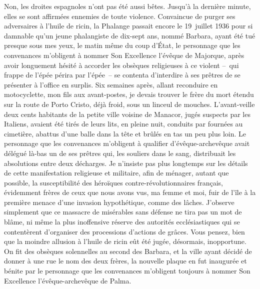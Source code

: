 \documentclass[french,twoside]{book} %
\newcommand{\astertri}{\medskip\par\centerline{\color{rubric}\large\selectfont{\syms ✻\,✻\,✻}}\medskip\par}%
\begin{document}
Non, les droites espagnoles n’ont pas été aussi bêtes. Jusqu’à la dernière minute, elles se sont affirmées ennemies de toute violence. Convaincue de purger ses adversaires à l’huile de ricin, la Phalange passait encore le 19 juillet 1936 pour si damnable qu’un jeune phalangiste de dix-sept ans, nommé Barbara, ayant été tué presque sous mes yeux, le matin même du coup d’État, le personnage que les convenances m’obligent à nommer Son Excellence l’évêque de Majorque, après avoir longuement hésité à accorder les obsèques religieuses à ce violent – qui frappe de l’épée périra par l’épée – se contenta d’interdire à ses prêtres de se présenter à l’office en surplis. Six semaines après, allant reconduire en motocyclette, mon fils aux avant-postes, je devais trouver le frère du mort étendu sur la route de Porto Cristo, déjà froid, sous un linceul de mouches. L’avant-veille deux cents habitants de la petite ville voisine de Manacor, jugés suspects par les Italiens, avaient été tirés de leurs lits, en pleine nuit, conduits par fournées au cimetière, abattus d’une balle dans la tête et brûlés en tas un peu plus loin. Le personnage que les convenances m’obligent à qualifier d’évêque-archevêque avait délégué là-bas un de ses prêtres qui, les souliers dans le sang, distribuait les absolutions entre deux décharges. Je n’insiste pas plus longtemps sur les détails de cette manifestation religieuse et militaire, afin de ménager, autant que possible, la susceptibilité des héroïques contre-révolutionnaires français, évidemment frères de ceux que nous avons vus, ma femme et moi, fuir de l’île à la première menace d’une invasion hypothétique, comme des lâches. J’observe simplement que ce massacre de misérables sans défense ne tira pas un mot de blâme, ni même la plus inoffensive réserve des autorités ecclésiastiques qui se contentèrent d’organiser des processions d’actions de grâces. Vous pensez, bien que la moindre allusion à l’huile de ricin eût été jugée, désormais, inopportune. On fit des obsèques solennelles au second des Barbara, et la ville ayant décidé de donner à une rue le nom des deux frères, la nouvelle plaque en fut inaugurée et bénite par le personnage que les convenances m’obligent toujours à nommer Son Excellence l’évêque-archevêque de Palma.\par
 \par

\astertri
\end{document}
